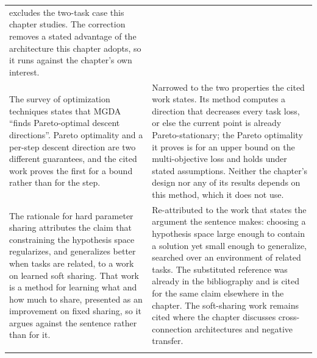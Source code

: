 {\begin{longtable}{@{}p{}p{}@{}}
excludes the two-task case this chapter studies. The correction removes a stated advantage of
the architecture this chapter adopts, so it runs against the chapter's own interest. \\
\addlinespace
The survey of optimization techniques states that MGDA ``finds Pareto-optimal descent
directions''. Pareto optimality and a per-step descent direction are two different
guarantees, and the cited work proves the first for a bound rather than for the step. &
Narrowed to the two properties the cited work states. Its method computes a direction that
decreases every task loss, or else the current point is already Pareto-stationary; the Pareto
optimality it proves is for an upper bound on the multi-objective loss and holds under stated
assumptions. Neither the chapter's design nor any of its results depends on this method, which
it does not use. \\
\addlinespace
The rationale for hard parameter sharing attributes the claim that constraining the
hypothesis space regularizes, and generalizes better when tasks are related, to a work on
learned soft sharing. That work is a method for learning what and how much to share,
presented as an improvement on fixed sharing, so it argues against the sentence rather than
for it. &
Re-attributed to the work that states the argument the sentence makes: choosing a hypothesis
space large enough to contain a solution yet small enough to generalize, searched over an
environment of related tasks. The substituted reference was already in the bibliography and
is cited for the same claim elsewhere in the chapter. The soft-sharing work remains cited
where the chapter discusses cross-connection architectures and negative transfer. \\
\addlinespace

\end{longtable}}
